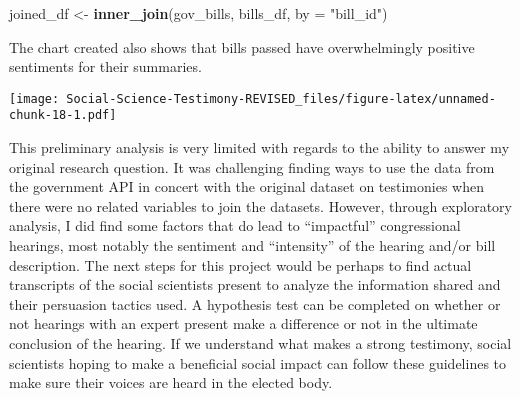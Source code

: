 \documentclass[]{article}
\newenvironment{Shaded}{\begin{snugshade}}{\end{snugshade}}
\newcommand{\CharTok}[1]{\textcolor[rgb]{0.31,0.60,0.02}{#1}}
\newcommand{\DataTypeTok}[1]{\textcolor[rgb]{0.13,0.29,0.53}{#1}}
\newcommand{\KeywordTok}[1]{\textcolor[rgb]{0.13,0.29,0.53}{\textbf{#1}}}
\newcommand{\NormalTok}[1]{#1}
\newcommand{\OperatorTok}[1]{\textcolor[rgb]{0.81,0.36,0.00}{\textbf{#1}}}
\newcommand{\OtherTok}[1]{\textcolor[rgb]{0.56,0.35,0.01}{#1}}
\newcommand{\StringTok}[1]{\textcolor[rgb]{0.31,0.60,0.02}{#1}}
\begin{document}
\begin{Shaded}
\begin{Highlighting}[]
\NormalTok{joined\_df \textless{}{-}}\StringTok{ }\KeywordTok{inner\_join}\NormalTok{(gov\_bills, bills\_df, }\DataTypeTok{by =} \StringTok{"bill\_id"}\NormalTok{)}
\end{Highlighting}
\end{Shaded}

The chart created also shows that bills passed have overwhelmingly
positive sentiments for their summaries.

\begin{Shaded}
\end{Shaded}

\texttt{[image: Social-Science-Testimony-REVISED\_files/figure-latex/unnamed-chunk-18-1.pdf]}

This preliminary analysis is very limited with regards to the ability to
answer my original research question. It was challenging finding ways to
use the data from the government API in concert with the original
dataset on testimonies when there were no related variables to join the
datasets. However, through exploratory analysis, I did find some factors
that do lead to ``impactful'' congressional hearings, most notably the
sentiment and ``intensity'' of the hearing and/or bill description. The
next steps for this project would be perhaps to find actual transcripts
of the social scientists present to analyze the information shared and
their persuasion tactics used. A hypothesis test can be completed on
whether or not hearings with an expert present make a difference or not
in the ultimate conclusion of the hearing. If we understand what makes a
strong testimony, social scientists hoping to make a beneficial social
impact can follow these guidelines to make sure their voices are heard
in the elected body.
\end{document}
